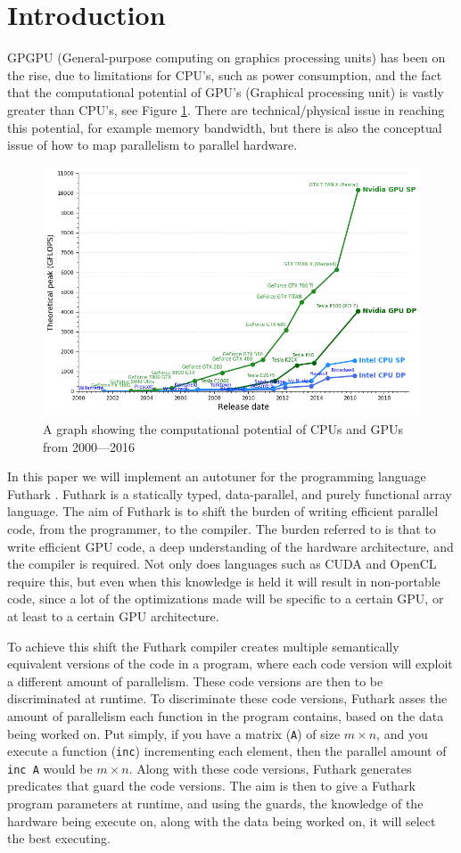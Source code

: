 \section{Introduction}
GPGPU (General-purpose computing on graphics processing units) has been on the rise, due to limitations for CPU's, such as power consumption, and the fact that the computational potential of GPU's (Graphical processing unit) is vastly greater than CPU's, see Figure \ref{potential}. There are technical/physical issue in reaching this potential, for example memory bandwidth, but there is also the conceptual issue of how to map parallelism to parallel hardware.
\begin{figure}[h]
	\centering
	\includegraphics[width=.8\textwidth]{resources/graf.png}
	\caption{A graph showing the computational potential of CPUs and GPUs from 2000---2016 \cite{cpu-vs-gpu}}
	\label{potential}
\end{figure}

In this paper we will implement an autotuner for the programming language Futhark \cite{futhark-home}. Futhark is a statically typed, data-parallel, and purely functional array language. The aim of Futhark is to shift the burden of writing efficient parallel code, from the programmer, to the compiler. The burden referred to is that to write efficient GPU code, a deep understanding of the hardware architecture, and the compiler is required. Not only does languages such as CUDA and OpenCL require this, but even when this knowledge is held it will result in non-portable code, since a lot of the optimizations made will be specific to a certain GPU, or at least to a certain GPU architecture. 

To achieve this shift the Futhark compiler creates multiple semantically equivalent versions of the code in a program, where each code version will exploit a different amount of parallelism. These code versions are then to be discriminated at runtime. To discriminate these code versions, Futhark asses the amount of parallelism each function in the program contains, based on the data being worked on. Put simply, if you have a matrix (\texttt{A}) of size $m \times n$, and you execute a function (\texttt{inc}) incrementing each element, then the parallel amount of \texttt{inc A} would be $m \times n$. Along with these code versions, Futhark generates predicates that guard the code versions. The aim is then to give a Futhark program parameters at runtime, and using the guards, the knowledge of the hardware being execute on, along with the data being worked on, it will select the best executing.

